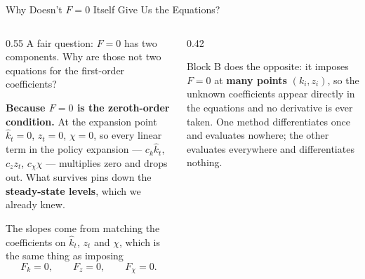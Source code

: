\begin{frame}{Why Doesn't $F=0$ Itself Give Us the Equations?}
\begin{columns}[T]
\begin{column}{0.55\textwidth}
\small
A fair question: $F=0$ has two components. Why are those not two equations for the first-order coefficients?
\medskip

\textbf{Because $F=0$ is the zeroth-order condition.} At the expansion point $\hat{k}_t=0$, $z_t=0$, $\chi=0$, so every linear term in the policy expansion --- $c_k\hat{k}_t$, $c_z z_t$, $c_\chi\chi$ --- multiplies zero and drops out. What survives pins down the \textbf{steady-state levels}, which we already knew.
\medskip

The slopes come from matching the coefficients on $\hat{k}_t$, $z_t$ and $\chi$, which is the same thing as imposing
\[
  F_k=0,\qquad F_z=0,\qquad F_\chi=0 .
\]
\end{column}
\begin{column}{0.42\textwidth}
\begin{conceptbox}[title=\textbf{Contrast with projection}]\small
Block B does the opposite: it imposes $F=0$ at \textbf{many points} $(k_i,z_i)$, so the unknown coefficients appear directly in the equations and no derivative is ever taken.
\medskip
One method differentiates once and evaluates nowhere; the other evaluates everywhere and differentiates nothing.
\end{conceptbox}
\end{column}
\end{columns}
\vspace{1mm}
\end{frame}

